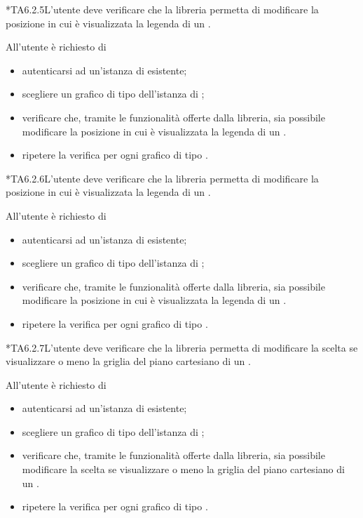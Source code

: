 	*{TA6.2.5}L'utente  deve verificare che la libreria permetta di modificare la posizione in cui è visualizzata la legenda di un .
		
		All'utente  è richiesto di
		\begin{itemize}
			\item autenticarsi ad un'istanza di \projectname{} esistente;
			\item scegliere un grafico di tipo  dell'istanza di \projectname{};
			\item verificare che, tramite le funzionalità offerte dalla libreria, sia possibile modificare la posizione in cui è visualizzata la legenda di un .
			\item ripetere la verifica per ogni grafico di tipo .
		\end{itemize}

	*{TA6.2.6}L'utente  deve verificare che la libreria permetta di modificare la posizione in cui è visualizzata la legenda di un .
		
		All'utente  è richiesto di
		\begin{itemize}
			\item autenticarsi ad un'istanza di \projectname{} esistente;
			\item scegliere un grafico di tipo  dell'istanza di \projectname{};
			\item verificare che, tramite le funzionalità offerte dalla libreria, sia possibile modificare la posizione in cui è visualizzata la legenda di un .
			\item ripetere la verifica per ogni grafico di tipo .
		\end{itemize}

	*{TA6.2.7}L'utente  deve verificare che la libreria permetta di modificare la scelta se visualizzare o meno la griglia del piano cartesiano di un .
		
		All'utente  è richiesto di
		\begin{itemize}
			\item autenticarsi ad un'istanza di \projectname{} esistente;
			\item scegliere un grafico di tipo  dell'istanza di \projectname{};
			\item verificare che, tramite le funzionalità offerte dalla libreria, sia possibile modificare la scelta se visualizzare o meno la griglia del piano cartesiano di un .
			\item ripetere la verifica per ogni grafico di tipo .
		\end{itemize}

